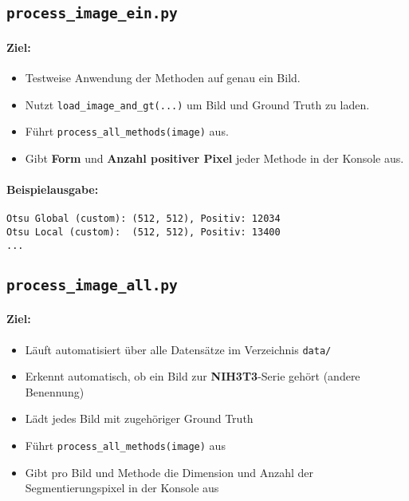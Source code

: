 \documentclass[a4paper,12pt]{article}
\begin{document}
\subsection*{ \texttt{process\_image\_ein.py}}

\paragraph{Ziel:}
\begin{itemize}
  \item Testweise Anwendung der Methoden auf genau ein Bild.
  \item Nutzt \texttt{load\_image\_and\_gt(...)} um Bild und Ground Truth zu laden.
  \item Führt \texttt{process\_all\_methods(image)} aus.
  \item Gibt \textbf{Form} und \textbf{Anzahl positiver Pixel} jeder Methode in der Konsole aus.
\end{itemize}

\paragraph{Beispielausgabe:}
\begin{verbatim}
Otsu Global (custom): (512, 512), Positiv: 12034
Otsu Local (custom):  (512, 512), Positiv: 13400
...
\end{verbatim}

\subsection*{ \texttt{process\_image\_all.py}}

\paragraph{Ziel:}
\begin{itemize}
  \item Läuft automatisiert über alle Datensätze im Verzeichnis \texttt{data/}
  \item Erkennt automatisch, ob ein Bild zur \textbf{NIH3T3}-Serie gehört (andere Benennung)
  \item Lädt jedes Bild mit zugehöriger Ground Truth
  \item Führt \texttt{process\_all\_methods(image)} aus
  \item Gibt pro Bild und Methode die Dimension und Anzahl der Segmentierungspixel in der Konsole aus
\end{itemize}
\end{document}
